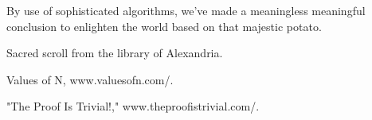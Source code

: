 \documentclass[11pt]{article}
\begin{document}
\begin{multicols}{2}
By use of sophisticated algorithms, we've made a meaningless meaningful conclusion to enlighten the world based on that majestic potato. 


\begin{thebibliography}{9}
	{\footnotesize
	 Sacred scroll from the library of Alexandria. 
	
	 Values of N, www.valuesofn.com/.
	
	 "The Proof Is Trivial!," www.theproofistrivial.com/.
	}
\end{thebibliography}
\end{multicols}

\end{document}
